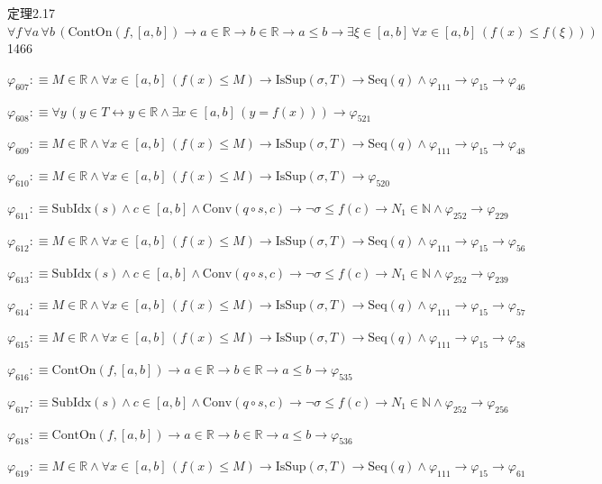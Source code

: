 \begin{fullproof}{定理2.17}{$\forall f\,\forall a\,\forall b\,(\mathrm{ContOn}(f,[a,b]) \to a \in \mathbb{R} \to b \in \mathbb{R} \to a \leq b \to \exists \xi \in [a,b]\,\forall x \in [a,b]\,(f(x) \leq f(\xi)))$}{1466}
\begin{abbrevlist}
\item $\varphi_{607} :\equiv M \in \mathbb{R} \land \forall x \in [a,b]\,(f(x) \leq M) \to \mathrm{IsSup}(\sigma,T) \to \mathrm{Seq}(q) \land \varphi_{111} \to \varphi_{15} \to \varphi_{46}$
\item $\varphi_{608} :\equiv \forall y\,(y \in T \leftrightarrow y \in \mathbb{R} \land \exists x \in [a,b]\,(y = f(x))) \to \varphi_{521}$
\item $\varphi_{609} :\equiv M \in \mathbb{R} \land \forall x \in [a,b]\,(f(x) \leq M) \to \mathrm{IsSup}(\sigma,T) \to \mathrm{Seq}(q) \land \varphi_{111} \to \varphi_{15} \to \varphi_{48}$
\item $\varphi_{610} :\equiv M \in \mathbb{R} \land \forall x \in [a,b]\,(f(x) \leq M) \to \mathrm{IsSup}(\sigma,T) \to \varphi_{520}$
\item $\varphi_{611} :\equiv \mathrm{SubIdx}(s) \land c \in [a,b] \land \mathrm{Conv}(q \circ s,c) \to \neg \sigma \leq f(c) \to N_{1} \in \mathbb{N} \land \varphi_{252} \to \varphi_{229}$
\item $\varphi_{612} :\equiv M \in \mathbb{R} \land \forall x \in [a,b]\,(f(x) \leq M) \to \mathrm{IsSup}(\sigma,T) \to \mathrm{Seq}(q) \land \varphi_{111} \to \varphi_{15} \to \varphi_{56}$
\item $\varphi_{613} :\equiv \mathrm{SubIdx}(s) \land c \in [a,b] \land \mathrm{Conv}(q \circ s,c) \to \neg \sigma \leq f(c) \to N_{1} \in \mathbb{N} \land \varphi_{252} \to \varphi_{239}$
\item $\varphi_{614} :\equiv M \in \mathbb{R} \land \forall x \in [a,b]\,(f(x) \leq M) \to \mathrm{IsSup}(\sigma,T) \to \mathrm{Seq}(q) \land \varphi_{111} \to \varphi_{15} \to \varphi_{57}$
\item $\varphi_{615} :\equiv M \in \mathbb{R} \land \forall x \in [a,b]\,(f(x) \leq M) \to \mathrm{IsSup}(\sigma,T) \to \mathrm{Seq}(q) \land \varphi_{111} \to \varphi_{15} \to \varphi_{58}$
\item $\varphi_{616} :\equiv \mathrm{ContOn}(f,[a,b]) \to a \in \mathbb{R} \to b \in \mathbb{R} \to a \leq b \to \varphi_{535}$
\item $\varphi_{617} :\equiv \mathrm{SubIdx}(s) \land c \in [a,b] \land \mathrm{Conv}(q \circ s,c) \to \neg \sigma \leq f(c) \to N_{1} \in \mathbb{N} \land \varphi_{252} \to \varphi_{256}$
\item $\varphi_{618} :\equiv \mathrm{ContOn}(f,[a,b]) \to a \in \mathbb{R} \to b \in \mathbb{R} \to a \leq b \to \varphi_{536}$
\item $\varphi_{619} :\equiv M \in \mathbb{R} \land \forall x \in [a,b]\,(f(x) \leq M) \to \mathrm{IsSup}(\sigma,T) \to \mathrm{Seq}(q) \land \varphi_{111} \to \varphi_{15} \to \varphi_{61}$

\end{abbrevlist}
\end{fullproof}
